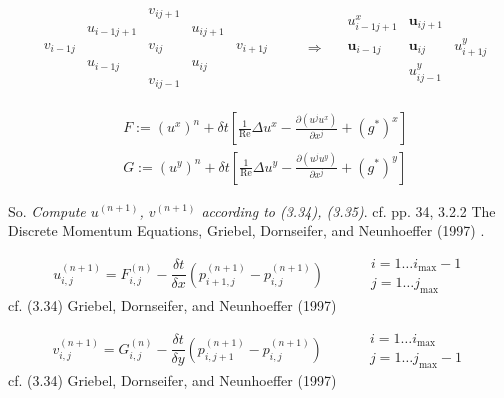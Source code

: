 \documentclass[10pt]{amsart}
\begin{document}
\begin{multicols*}{2}
\[
\begin{aligned}
& \begin{matrix}
    & & v_{ij+1} & & \\
    & u_{i-1j+1} &  & u_{ij+1} &  \\
v_{i-1j} &         & v_{ij}  &          &  v_{i+1j} \\     
& u_{i-1j} &        & u_{ij} &         \\
&         & v_{ij-1} &          & 
  \end{matrix} \qquad \, \Longrightarrow \quad \, 
  \begin{matrix}
u^x_{i-1j+1}          & \mathbf{u}_{ij+1}       &      \\
\mathbf{u}_{i-1j} & \mathbf{u}_{ij} & u^y_{i+1j} \\ 
         & u^y_{ij-1} &  
  \end{matrix}
  \end{aligned}
\]


\begin{equation}
\begin{aligned}
  & F := (u^x)^n + \delta t \left[ \frac{1}{\text{Re}}\Delta u^x - \frac{ \partial (u^ju^x)}{ \partial x^j} + (g^*)^x \right] \\
  & G := (u^y)^n + \delta t \left[ \frac{1}{\text{Re}}\Delta u^y - \frac{ \partial (u^ju^y)}{ \partial x^j} + (g^*)^y \right]
  \end{aligned}
  \end{equation}

So.  \emph{Compute $u^{(n+1)}$, $v^{(n+1)}$ according to (3.34), (3.35)}.  cf. pp. 34, 3.2.2 The Discrete Momentum Equations, Griebel, Dornseifer, and Neunhoeffer (1997) \cite{GDN1997}.

\begin{equation}
  u_{i,j}^{(n+1)} = F_{i,j}^{(n)} - \frac{ \delta t}{ \delta x }( p_{i+1,j}^{(n+1)} - p_{i,j}^{(n+1)} ) \qquad \, \begin{aligned}  & i = 1 \dots i_{\text{max}} - 1  \\
    & j = 1 \dots j_{\text{max}} \end{aligned} 
\end{equation}
cf. (3.34) Griebel, Dornseifer, and Neunhoeffer (1997) \cite{GDN1997}

\begin{equation}
  v_{i,j}^{(n+1)} = G_{i,j}^{(n)} - \frac{ \delta t}{ \delta y }( p_{i,j+1}^{(n+1)} - p_{i,j}^{(n+1)} ) \qquad \, \begin{aligned}  & i = 1 \dots i_{\text{max}}   \\
    & j = 1 \dots j_{\text{max}} -1 \end{aligned} 
\end{equation}
cf. (3.34) Griebel, Dornseifer, and Neunhoeffer (1997) \cite{GDN1997}


\end{multicols*}
\end{document}
